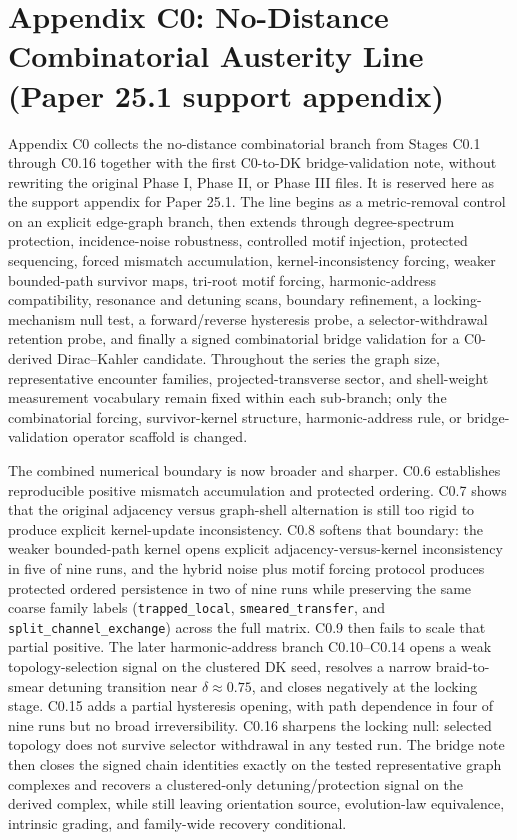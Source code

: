\section*{Appendix C0: No-Distance Combinatorial Austerity Line (Paper 25.1 support appendix)}

Appendix C0 collects the no-distance combinatorial branch from Stages C0.1 through C0.16 together with the first C0-to-DK bridge-validation note, without rewriting the original Phase I, Phase II, or Phase III files. It is reserved here as the support appendix for Paper 25.1. The line begins as a metric-removal control on an explicit edge-graph branch, then extends through degree-spectrum protection, incidence-noise robustness, controlled motif injection, protected sequencing, forced mismatch accumulation, kernel-inconsistency forcing, weaker bounded-path survivor maps, tri-root motif forcing, harmonic-address compatibility, resonance and detuning scans, boundary refinement, a locking-mechanism null test, a forward/reverse hysteresis probe, a selector-withdrawal retention probe, and finally a signed combinatorial bridge validation for a C0-derived Dirac--Kahler candidate. Throughout the series the graph size, representative encounter families, projected-transverse sector, and shell-weight measurement vocabulary remain fixed within each sub-branch; only the combinatorial forcing, survivor-kernel structure, harmonic-address rule, or bridge-validation operator scaffold is changed.

The combined numerical boundary is now broader and sharper. C0.6 establishes reproducible positive mismatch accumulation and protected ordering. C0.7 shows that the original adjacency versus graph-shell alternation is still too rigid to produce explicit kernel-update inconsistency. C0.8 softens that boundary: the weaker bounded-path kernel opens explicit adjacency-versus-kernel inconsistency in five of nine runs, and the hybrid noise plus motif forcing protocol produces protected ordered persistence in two of nine runs while preserving the same coarse family labels (\texttt{trapped\_local}, \texttt{smeared\_transfer}, and \texttt{split\_channel\_exchange}) across the full matrix. C0.9 then fails to scale that partial positive. The later harmonic-address branch C0.10--C0.14 opens a weak topology-selection signal on the clustered DK seed, resolves a narrow braid-to-smear detuning transition near $\delta \approx 0.75$, and closes negatively at the locking stage. C0.15 adds a partial hysteresis opening, with path dependence in four of nine runs but no broad irreversibility. C0.16 sharpens the locking null: selected topology does not survive selector withdrawal in any tested run. The bridge note then closes the signed chain identities exactly on the tested representative graph complexes and recovers a clustered-only detuning/protection signal on the derived complex, while still leaving orientation source, evolution-law equivalence, intrinsic grading, and family-wide recovery conditional.

